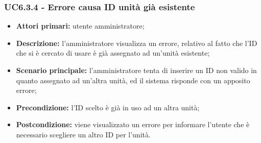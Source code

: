 \subsubsection{UC6.3.4 - Errore causa ID unità già esistente}
\begin{itemize}
	\item \textbf{Attori primari:} utente amministratore;
	\item \textbf{Descrizione:} l'amministratore visualizza un errore, relativo al fatto che l'ID che si è cercato di usare è già assegnato ad un'unità esistente;
	\item \textbf{Scenario principale:} l'amministratore tenta di inserire un ID non valido in quanto assegnato ad un'altra unità, ed il sistema risponde con un apposito errore;
	\item \textbf{Precondizione:} l'ID scelto è già in uso ad un altra unità;
	\item \textbf{Postcondizione:} viene visualizzato un errore per informare l'utente che è necessario scegliere un altro ID per l'unità.
\end{itemize}